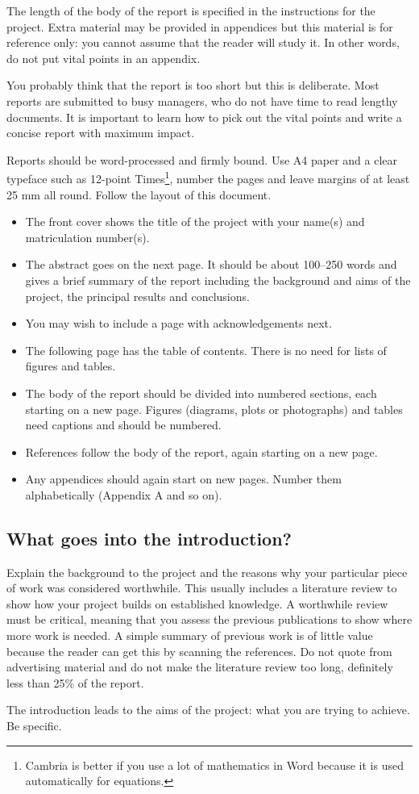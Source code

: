 The length of the body of the report is specified in the instructions for the
project. Extra material may be provided in appendices but this material is for
reference only: you cannot assume that the reader will study it. In other words,
do not put vital points in an appendix.

You probably think that the report is too short but this is deliberate. Most
reports are submitted to busy managers, who do not have time to read lengthy
documents. It is important to learn how to pick out the vital points and write a
concise report with maximum impact.

Reports should be word-processed and firmly bound. Use A4 paper and a clear
typeface such as 12-point Times\footnote{Cambria is better if you use a lot of
    mathematics in Word because it is used automatically for equations.}, number the
pages and leave margins of at least 25 mm all round. Follow the layout of this
document.

\begin{itemize}
    \item The front cover shows the title of the project with your name(s) and
          matriculation number(s).
    \item The abstract goes on the next page. It should be about 100–250 words
          and gives a brief summary of the report including the background and
          aims of the project, the principal results and conclusions.
    \item You may wish to include a page with acknowledgements next.
    \item The following page has the table of contents. There is no need for
          lists of figures and tables.
    \item The body of the report should be divided into numbered sections, each
          starting on a new page. Figures (diagrams, plots or photographs) and
          tables need captions and should be numbered.
    \item References follow the body of the report, again starting on a new
          page.
    \item Any appendices should again start on new pages. Number them
          alphabetically (Appendix A and so on).
\end{itemize}

\subsection{What goes into the introduction?}

Explain the background to the project and the reasons why your particular piece
of work was considered worthwhile. This usually includes a literature review to
show how your project builds on established knowledge. A worthwhile review must
be critical, meaning that you assess the previous publications to show where
more work is needed. A simple summary of previous work is of little value
because the reader can get this by scanning the references. Do not quote from
advertising material and do not make the literature review too long, definitely
less than 25\% of the report.

The introduction leads to the aims of the project: what you are trying to
achieve. Be specific.